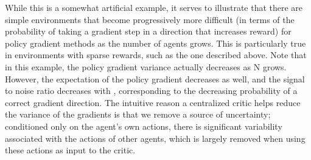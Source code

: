 \documentclass{article}
\begin{document}
While this is a somewhat artificial example, it serves to illustrate that there are simple environments that become progressively more difficult  (in terms of the probability of taking a gradient step in a direction that increases reward) for policy gradient methods as the number of agents grows. This is particularly true in environments with sparse rewards, such as the one described above. Note that in this example, the policy gradient variance  actually decreases as N grows. However, the expectation of the policy gradient decreases as well, and the signal to noise ratio  decreases with , corresponding to the decreasing probability of a correct gradient direction. The intuitive reason a centralized critic helps reduce the variance of the gradients is that we remove a source of uncertainty; conditioned only on the agent's own actions, there is significant variability associated with the actions of other agents, which is largely removed when using these actions as input to the critic.
\end{document}
